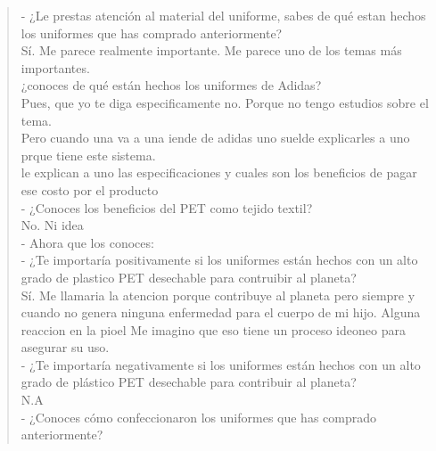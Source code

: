 \documentclass[11pt]{article}
\begin{document}
\begin{verse}
\vspace*{1em}
- ¿Le prestas atención al material del uniforme, sabes de qué estan hechos los uniformes que has comprado anteriormente?\\
\vspace*{1em}
\hspace*{2em}Sí. Me parece realmente importante. Me parece uno de los temas más importantes.\\
\hspace*{2em}¿conoces de qué están hechos los uniformes de Adidas?\\
\hspace*{2em}Pues, que yo te diga especificamente no. Porque no tengo estudios sobre el tema.\\
\hspace*{2em}Pero cuando una va a una iende de adidas uno suelde explicarles a uno prque tiene este sistema.\\
\hspace*{2em}le explican a uno las especificaciones y cuales son los beneficios de pagar ese costo por el producto\\
\vspace*{1em}
\hspace*{2em}- ¿Conoces los beneficios del PET como tejido textil?\\
\hspace*{2em}No. Ni idea\\
- Ahora que los conoces:\\
- ¿Te importaría positivamente si los uniformes están hechos con un alto grado de plastico PET desechable para contruibir al planeta?\\
\vspace*{1em}
\hspace*{2em}Sí. Me llamaria la atencion porque contribuye al planeta pero siempre y cuando no genera ninguna enfermedad para el cuerpo de mi hijo. Alguna reaccion en la pioel  Me imagino que eso tiene un proceso ideoneo para asegurar su uso.\\
\vspace*{1em}
- ¿Te importaría negativamente si los uniformes están hechos con un alto grado de plástico PET desechable para contribuir al planeta?\\
\vspace*{1em}
\hspace*{2em}N.A\\
\vspace*{1em}
- ¿Conoces cómo confeccionaron los uniformes que has comprado anteriormente?\\

\end{verse}
\end{document}
